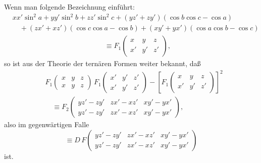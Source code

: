 \documentclass[11pt]{article}
\newcommand{\ffone}[6]{F_1\!\left(\begin{array}{ccc}#1&#2&#3\\#4&#5&#6\end{array}\right)}
\begin{document}
Wenn man folgende Bezeichnung einführt:
\[
\begin{aligned}
&xx'\sin^2a+yy'\sin^2b+zz'\sin^2c+(yz'+zy')(\cos b\cos c-\cos a)\\
&\quad +(zx'+xz')(\cos c\cos a-\cos b)+(xy'+yx')(\cos a\cos b-\cos c)\\
&\hspace{13em}\equiv \ffone{x}{y}{z}{x'}{y'}{z'},
\end{aligned}
\]
so ist aus der Theorie der ternären Formen weiter bekannt, daß
\[
\begin{aligned}
&\ffone{x}{y}{z}{x}{y}{z}\,\ffone{x'}{y'}{z'}{x'}{y'}{z'}
-\left[\ffone{x}{y}{z}{x'}{y'}{z'}\right]^2\\
&\quad\equiv F_2\!\left(\begin{array}{ccc}
yz'-zy'&zx'-xz'&xy'-yx'\\
yz'-zy'&zx'-xz'&xy'-yx'
\end{array}\right),
\end{aligned}
\]
also im gegenwärtigen Falle
\begin{equation}
\equiv D\,F\!\left(\begin{array}{ccc}
yz'-zy'&zx'-xz'&xy'-yx'\\
yz'-zy'&zx'-xz'&xy'-yx'
\end{array}\right)
\tag{7}
\end{equation}
ist.
\end{document}
